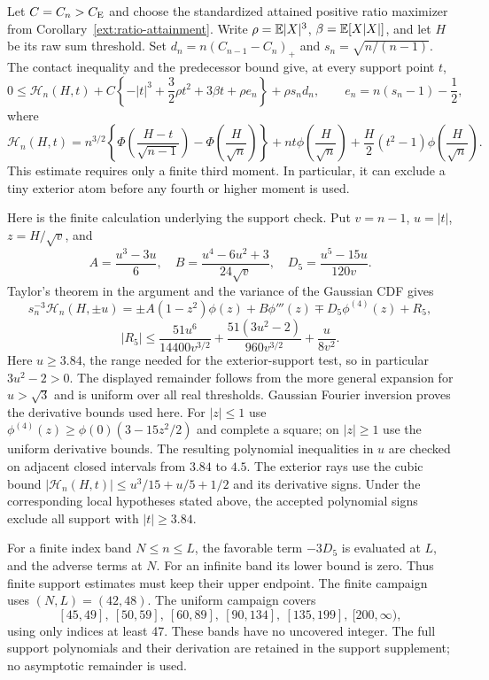 Let $C=C_n>C_{\mathrm E}$ and choose the standardized attained positive ratio
maximizer from Corollary~\ref{ext:ratio-attainment}. Write
$\rho=\mathbb E|X|^3$, $\beta=\mathbb E[X|X|]$, and let $H$ be its raw sum
threshold. Set $d_n=n(C_{n-1}-C_n)_+$ and
$s_n=\sqrt{n/(n-1)}$. The contact inequality and the predecessor bound
give, at every support point $t$,
\begin{equation}\label{ext:contact-support}
 0\le \mathcal H_n(H,t)+C\left\{-|t|^3+
       \frac32\rho t^2+3\beta t+\rho e_n\right\}
       +\rho s_n d_n,
 \qquad e_n=n(s_n-1)-\frac12,
\end{equation}
where
\[
 \mathcal H_n(H,t)=n^{3/2}
 \left\{\Phi\left(\frac{H-t}{\sqrt{n-1}}\right)
              -\Phi\left(\frac H{\sqrt n}\right)\right\}
 +nt\phi\left(\frac H{\sqrt n}\right)
 +\frac H2(t^2-1)\phi\left(\frac H{\sqrt n}\right).
\]
This estimate requires only a finite third moment. In particular, it
can exclude a tiny exterior atom before any fourth or higher moment
is used.

Here is the finite calculation underlying the support check. Put
$v=n-1$, $u=|t|$, $z=H/\sqrt v$, and
\[
 A=\frac{u^3-3u}{6},\quad
 B=\frac{u^4-6u^2+3}{24\sqrt v},\quad
 D_5=\frac{u^5-15u}{120v}.
\]
Taylor's theorem in the argument and the variance of the Gaussian CDF
gives
\[
 s_n^{-3}\mathcal H_n(H,\pm u)
 =\pm A(1-z^2)\phi(z)+B\phi'''(z)
       \mp D_5\phi^{(4)}(z)+R_5,
\]
\[
 |R_5|\le \frac{51u^6}{14400v^{3/2}}
       +\frac{51(3u^2-2)}{960v^{3/2}}+\frac{u}{8v^2}.
\]
Here $u\ge3.84$, the range needed for the exterior-support test, so in
particular $3u^2-2>0$. The displayed remainder follows from the
more general expansion for $u>\sqrt3$ and is uniform over all real
thresholds. Gaussian Fourier
inversion proves the derivative bounds used here. For $|z|\le1$ use
$\phi^{(4)}(z)\ge\phi(0)(3-15z^2/2)$ and complete a square; on
$|z|\ge1$ use the uniform derivative bounds. The resulting polynomial
inequalities in $u$ are checked on adjacent closed intervals from
$3.84$ to $4.5$. The exterior rays use the cubic bound
$|\mathcal H_n(H,t)|\le u^3/15+u/5+1/2$ and its derivative signs.
Under the corresponding local hypotheses stated above, the accepted
polynomial signs exclude all support with $|t|\ge3.84$.

For a finite index band $N\le n\le L$, the favorable term
$-3D_5$ is evaluated at $L$, and the adverse terms at $N$.
For an infinite band its lower bound is zero. Thus finite support
estimates must keep their upper endpoint. The finite campaign uses
$(N,L)=(42,48)$. The uniform campaign covers
\[
 [45,49],\ [50,59],\ [60,89],\ [90,134],\ [135,199],\ [200,\infty),
\]
using only indices at least 47. These bands have no uncovered integer.
The full support polynomials and their derivation are retained in the
support supplement; no asymptotic remainder is used.

